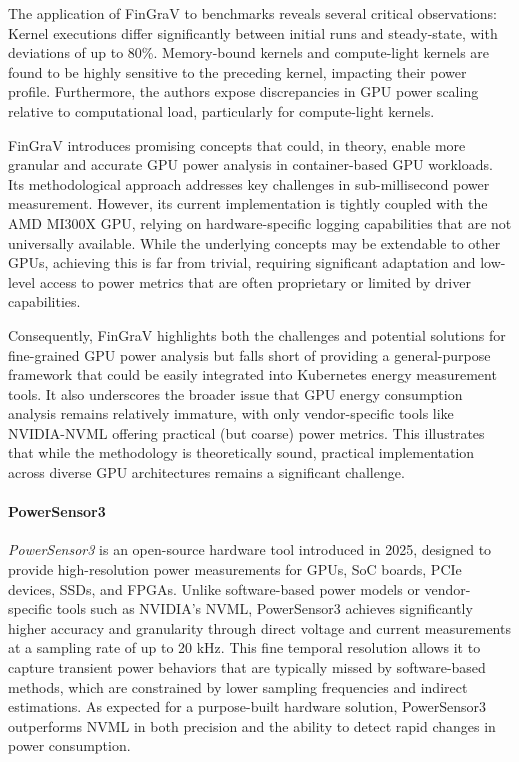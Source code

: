 The application of FinGraV to benchmarks reveals several critical observations: Kernel executions differ significantly between initial runs and steady-state, with deviations of up to 80\%. Memory-bound kernels and compute-light kernels are found to be highly sensitive to the preceding kernel, impacting their power profile. Furthermore, the authors expose discrepancies in GPU power scaling relative to computational load, particularly for compute-light kernels.

FinGraV introduces promising concepts that could, in theory, enable more granular and accurate GPU power analysis in container-based GPU workloads. Its methodological approach addresses key challenges in sub-millisecond power measurement. However, its current implementation is tightly coupled with the AMD MI300X GPU, relying on hardware-specific logging capabilities that are not universally available. While the underlying concepts may be extendable to other GPUs, achieving this is far from trivial, requiring significant adaptation and low-level access to power metrics that are often proprietary or limited by driver capabilities.

Consequently, FinGraV highlights both the challenges and potential solutions for fine-grained GPU power analysis but falls short of providing a general-purpose framework that could be easily integrated into Kubernetes energy measurement tools. It also underscores the broader issue that GPU energy consumption analysis remains relatively immature, with only vendor-specific tools like NVIDIA-NVML offering practical (but coarse) power metrics. This illustrates that while the methodology is theoretically sound, practical implementation across diverse GPU architectures remains a significant challenge.

\paragraph{PowerSensor3}

\textit{PowerSensor3}\parencite{van2025powersensor3} is an open-source hardware tool introduced in 2025, designed to provide high-resolution power measurements for GPUs, SoC boards, PCIe devices, SSDs, and FPGAs. Unlike software-based power models or vendor-specific tools such as NVIDIA's NVML, PowerSensor3 achieves significantly higher accuracy and granularity through direct voltage and current measurements at a sampling rate of up to 20 kHz. This fine temporal resolution allows it to capture transient power behaviors that are typically missed by software-based methods, which are constrained by lower sampling frequencies and indirect estimations. As expected for a purpose-built hardware solution, PowerSensor3 outperforms NVML in both precision and the ability to detect rapid changes in power consumption.

